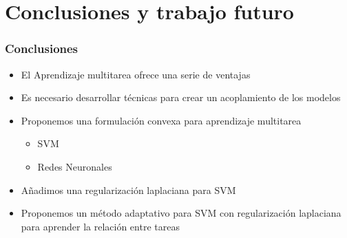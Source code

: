 \documentclass[aspectratio=43,spanish]{beamer}
\begin{document}


\section{Conclusiones y trabajo futuro}

\begin{frame}
\frametitle{Conclusiones}
\begin{itemize}
      \item El Aprendizaje multitarea ofrece una serie de ventajas
      \item Es necesario desarrollar técnicas para crear un acoplamiento de los modelos
      \item Proponemos una formulación convexa para aprendizaje multitarea%
      \begin{itemize}
            \item SVM
            \item Redes Neuronales
      \end{itemize}
      \item Añadimos una regularización laplaciana para SVM%
      
      \item Proponemos un método adaptativo para SVM con regularización laplaciana para aprender la relación entre tareas
      
            
\end{itemize}
\end{frame}
\end{document}

